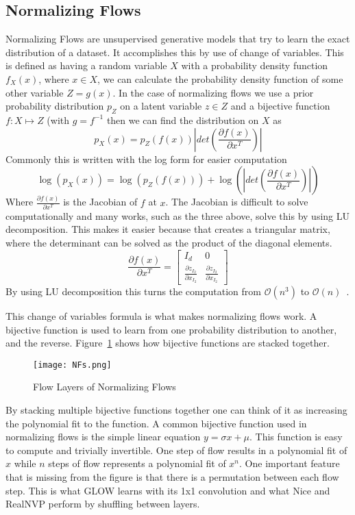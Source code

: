 \subsection{Normalizing Flows}
Normalizing Flows are unsupervised generative models that try to learn the exact
distribution of a dataset. It accomplishes this by use of change of variables.
This is defined as having a random variable $X$ with a probability density
function $f_X(x)$, where $x\in X$, we can calculate the probability density
function of some other variable $Z=g(x)$. In the case of normalizing flows we
use a prior probability distribution $p_Z$ on a latent variable $z\in Z$ and a
bijective function $f: X\mapsto Z$ (with $g = f^{-1}$ then we can find the
distribution on $X$ as
%
\begin{equation}
    p_X(x) = p_Z(f(x))\left | det\left(\frac{\partial f(x)}{\partial x^T}
        \right)\right |
\end{equation}
Commonly this is written with the log form for easier computation
\begin{equation}
    \log(p_X(x)) = \log(p_Z(f(x))) + \log\left(\left| det \left(
            \frac{\partial f(x)}{\partial x^T} \right) \right | \right )
\end{equation}
%
Where $\frac{\partial f(x)}{\partial x^T}$ is the Jacobian of $f$ at $x$. The
Jacobian is difficult to solve computationally and many works, such as the three
above, solve this by using LU decomposition. This makes it easier because that
creates a triangular matrix, where the determinant can be solved as the product
of the diagonal elements. 
%
\begin{equation}
    \frac{\partial f(x)}{\partial x^T} = \begin{bmatrix} I_d & 0 \\ \frac{\partial
    z_{I_2}}{\partial x_{I_2}} & \frac{\partial z_{I_2}}{\partial
    x_{I_2}}\end{bmatrix}
\end{equation}
%
By using LU decomposition this turns the computation from $\mathcal{O}(n^3)$ to
$\mathcal{O}(n)$~\cite{glow}.

This change of variables formula is what makes normalizing flows work. A
bijective function is used to learn from one probability distribution to
another, and the reverse. Figure~\ref{fig:nf} shows how bijective functions are
stacked together.
%
\begin{figure}[ht]
\center\texttt{[image: NFs.png]}
\caption{Flow Layers of Normalizing Flows~\cite{weng2018flow}}
\label{fig:nf}
\end{figure}
%
By stacking multiple bijective functions together one can think of it as
increasing the polynomial fit to the function. A common bijective function used
in normalizing flows is the simple linear equation $y = \sigma x + \mu$. This
function is easy to compute and trivially invertible. One step of flow results
in a polynomial fit of $x$ while $n$ steps of flow represents a polynomial fit
of $x^n$. One important feature that is missing from the figure is that there is
a permutation between each flow step. This is what GLOW learns with its 1x1
convolution and what Nice and RealNVP perform by shuffling between layers.

